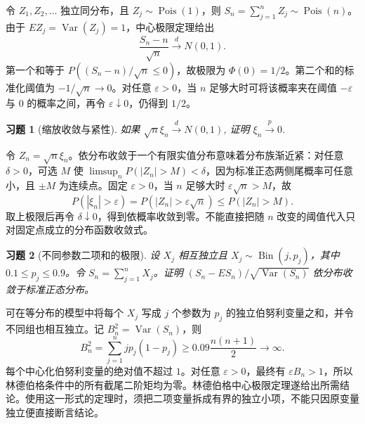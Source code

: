 \documentclass[UTF8,12pt,a4paper,fontset=fandol]{ctexart}
\newtheorem{exercise}{习题}[section]
\begin{document}
\begin{solve}\label{a:A7.20}令 $Z_1,Z_2,\ldots$ 独立同分布，且 $Z_j\sim\operatorname{Pois}(1)$，则 $S_n=\sum_{j=1}^nZ_j\sim\operatorname{Pois}(n)$。由于 $EZ_j=\operatorname{Var}(Z_j)=1$，中心极限定理给出\[\frac{S_n-n}{\sqrt n}\xrightarrow{d}N(0,1).\]第一个和等于 $P((S_n-n)/\sqrt n\le0)$，故极限为 $\Phi(0)=1/2$。第二个和的标准化阈值为 $-1/\sqrt n\to0$。对任意 $\varepsilon>0$，当 $n$ 足够大时可将该概率夹在阈值 $-\varepsilon$ 与 $0$ 的概率之间，再令 $\varepsilon\downarrow0$，仍得到 $1/2$。\end{solve}

\begin{exercise}[缩放收敛与紧性]\label{q:A7.21}
如果 $\sqrt{n}\xi_n\xrightarrow{d}N(0,1)$, 证明 $\xi_n\xrightarrow{p}0$.\par{}
\end{exercise}

\begin{solve}\label{a:A7.21}令 $Z_n=\sqrt n\xi_n$。依分布收敛于一个有限实值分布意味着分布族渐近紧：对任意 $\delta>0$，可选 $M$ 使 $\limsup_nP(|Z_n|>M)<\delta$，因为标准正态两侧尾概率可任意小，且 $\pm M$ 为连续点。固定 $\varepsilon>0$，当 $n$ 足够大时 $\varepsilon\sqrt n>M$，故\[P(|\xi_n|>\varepsilon)=P(|Z_n|>\varepsilon\sqrt n)\le P(|Z_n|>M).\]取上极限后再令 $\delta\downarrow0$，得到依概率收敛到零。不能直接把随 $n$ 改变的阈值代入只对固定点成立的分布函数收敛式。\end{solve}

\begin{exercise}[不同参数二项和的极限]\label{q:A7.22}
设 $X_j$ 相互独立且 $X_j\sim\operatorname{Bin}(j,p_j)$，其中 $0.1\le p_j\le0.9$。令 $S_n=\sum_{j=1}^nX_j$。证明 $(S_n-ES_n)/\sqrt{\operatorname{Var}(S_n)}$ 依分布收敛于标准正态分布。\par{}
\end{exercise}

\begin{solve}\label{a:A7.22}可在等分布的模型中将每个 $X_j$ 写成 $j$ 个参数为 $p_j$ 的独立伯努利变量之和，并令不同组也相互独立。记 $B_n^2=\operatorname{Var}(S_n)$，则\[B_n^2=\sum_{j=1}^n jp_j(1-p_j)\ge0.09\frac{n(n+1)}2\longrightarrow\infty.\]每个中心化伯努利变量的绝对值不超过 $1$。对任意 $\varepsilon>0$，最终有 $\varepsilon B_n>1$，所以林德伯格条件中的所有截尾二阶矩均为零。林德伯格中心极限定理遂给出所需结论。使用这一形式的定理时，须把二项变量拆成有界的独立小项，不能只因原变量独立便直接断言结论。\end{solve}
\end{document}
